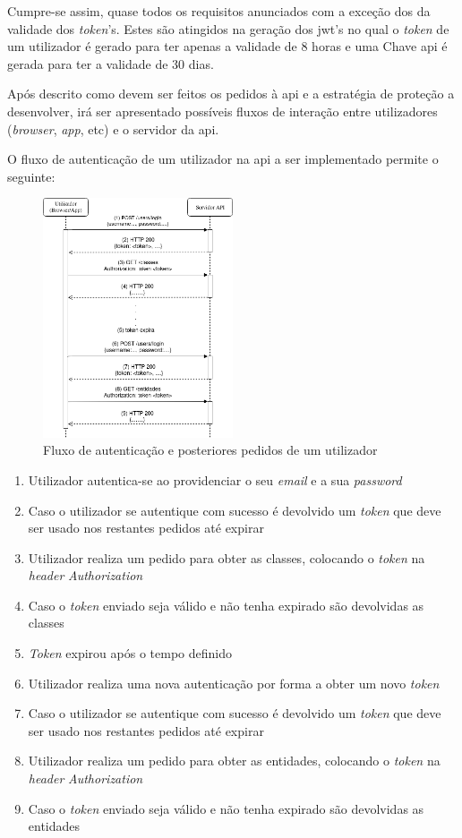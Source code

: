 Cumpre-se assim, quase todos os requisitos anunciados com a exceção dos da validade dos \textit{token}'s. Estes são atingidos na geração dos \acrshort{jwt}'s no qual o \textit{token} de um utilizador é gerado para ter apenas a validade de 8 horas e uma Chave \acrshort{api} é gerada para ter a validade de 30 dias.

Após descrito como devem ser feitos os pedidos à \acrshort{api} e a estratégia de proteção a desenvolver, irá ser apresentado possíveis fluxos de interação entre utilizadores (\textit{browser}, \textit{app}, etc) e o servidor da \acrshort{api}.

O fluxo de autenticação de um utilizador na \acrshort{api} a ser implementado permite o seguinte:
\begin{figure}[H]
    \centering
    \includegraphics[width=0.5\textwidth]{img/userAuth.png}
    \caption{Fluxo de autenticação e posteriores pedidos de um utilizador}\label{fig:userAuth}
\end{figure}

\begin{enumerate}
    \item Utilizador autentica-se ao providenciar o seu \textit{email} e a sua \textit{password}
    \item Caso o utilizador se autentique com sucesso é devolvido um \textit{token} que deve ser usado nos restantes pedidos até expirar
    \item Utilizador realiza um pedido para obter as classes, colocando o \textit{token} na \textit{header} \textit{Authorization}
    \item Caso o \textit{token} enviado seja válido e não tenha expirado são devolvidas as classes
    \item \textit{Token} expirou após o tempo definido
    \item Utilizador realiza uma nova autenticação por forma a obter um novo \textit{token}
    \item Caso o utilizador se autentique com sucesso é devolvido um \textit{token} que deve ser usado nos restantes pedidos até expirar
    \item Utilizador realiza um pedido para obter as entidades, colocando o \textit{token} na \textit{header} \textit{Authorization}
    \item Caso o \textit{token} enviado seja válido e não tenha expirado são devolvidas as entidades
\end{enumerate}

